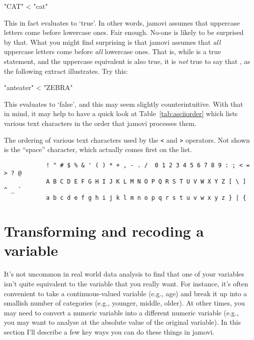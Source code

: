 \begin{rblock1}
"CAT" < "cat"
\end{rblock1}
This in fact evaluates to `true'. In other words, jamovi assumes that uppercase letters come before lowercase ones. Fair enough. No-one is likely to be surprised by that. What you might find surprising is that jamovi assumes that {\it all} uppercase letters come before {\it all} lowercase ones. That is, while  is a true statement, and the uppercase equivalent  is also true, it is {\it not} true to say that , as the following extract illustrates. Try this: 
\begin{rblock1}
"anteater" < "ZEBRA"
\end{rblock1}
This evaluates to `false', and this may seem slightly counterintuitive. With that in mind, it may help to have a quick look at Table~\ref{tab:asciiorder} which lists various text characters in the order that jamovi processes them. 

\begin{table}
\begin{center}
\caption{The ordering of various text characters used by the \texttt{<} and \texttt{>} operators. Not shown is the ``space'' character, which actually comes first on the list.}\tabcapsep
\label{tab:asciiorder}
\begin{verbatim}
            ! " # $ % & ' ( ) * + , - . /  0 1 2 3 4 5 6 7 8 9 : ; < = > ? @ 
            A B C D E F G H I J K L M N O P Q R S T U V W X Y Z [ \ ]  ^ _ ` 
            a b c d e f g h i j k l m n o p q r s t u v w x y z } | {
\end{verbatim}
\HR
\end{center}
\end{table}


\section{Transforming and recoding a variable~\label{sec:transform}}

It's not uncommon in real world data analysis to find that one of your variables isn't quite equivalent to the variable that you really want. For instance, it's often convenient to take a continuous-valued variable (e.g., age) and break it up into a smallish number of categories (e.g., younger, middle, older). At other times, you may need to convert a numeric variable into a different numeric variable (e.g., you may want to analyse at the absolute value of the original variable). In this section I'll describe a few key ways you can do these things in jamovi. 

